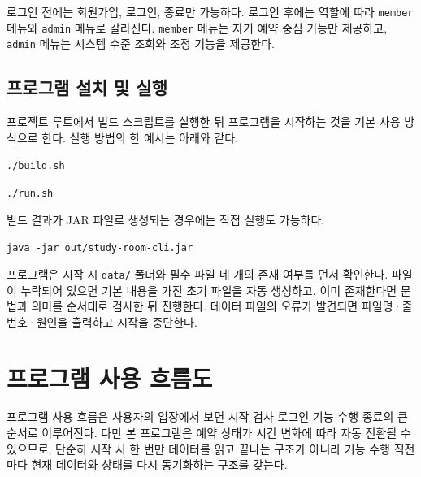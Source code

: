 \documentclass[a4paper,10pt]{article}
\begin{document}
로그인 전에는 회원가입, 로그인, 종료만 가능하다. 로그인 후에는 역할에 따라 \texttt{member} 메뉴와 \texttt{admin} 메뉴로 갈라진다. \texttt{member} 메뉴는 자기 예약 중심 기능만 제공하고, \texttt{admin} 메뉴는 시스템 수준 조회와 조정 기능을 제공한다.

\subsection{프로그램 설치 및 실행}
프로젝트 루트에서 빌드 스크립트를 실행한 뒤 프로그램을 시작하는 것을 기본 사용 방식으로 한다. 실행 방법의 한 예시는 아래와 같다.

\begin{menubox}
\small
\texttt{./build.sh}\par
\texttt{./run.sh}
\end{menubox}

빌드 결과가 JAR 파일로 생성되는 경우에는 직접 실행도 가능하다.

\begin{menubox}
\small
\texttt{java -jar out/study-room-cli.jar}
\end{menubox}

프로그램은 시작 시 \texttt{data/} 폴더와 필수 파일 네 개의 존재 여부를 먼저 확인한다. 파일이 누락되어 있으면 기본 내용을 가진 초기 파일을 자동 생성하고, 이미 존재한다면 문법과 의미를 순서대로 검사한 뒤 진행한다. 데이터 파일의 오류가 발견되면 파일명·줄번호·원인을 출력하고 시작을 중단한다.

\section{프로그램 사용 흐름도}
프로그램 사용 흐름은 사용자의 입장에서 보면 시작-검사-로그인-기능 수행-종료의 큰 순서로 이루어진다. 다만 본 프로그램은 예약 상태가 시간 변화에 따라 자동 전환될 수 있으므로, 단순히 시작 시 한 번만 데이터를 읽고 끝나는 구조가 아니라 기능 수행 직전마다 현재 데이터와 상태를 다시 동기화하는 구조를 갖는다.
\end{document}
